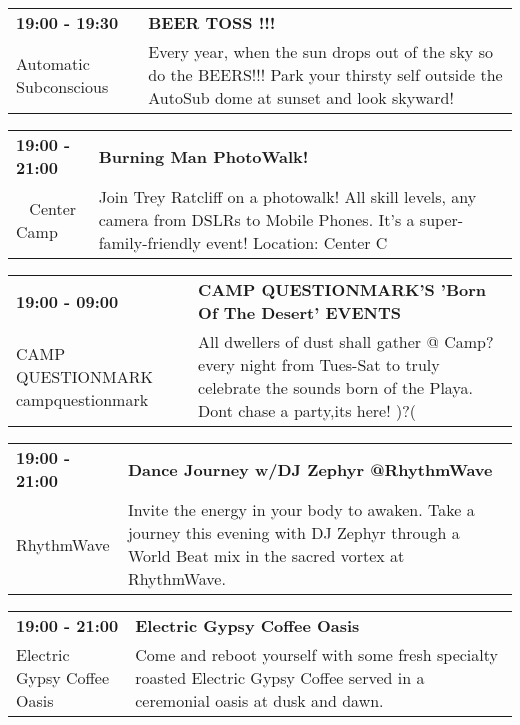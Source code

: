 \begin{tabular}{ p{1in} p{2.2in} }
    \textbf{19:00 - 19:30} & \textbf{BEER TOSS !!!} \\
    Automatic Subconscious \newline  & Every year, when the sun drops out of the sky so do the BEERS!!! Park your thirsty self outside the AutoSub dome at sunset and look skyward! \\
    \hline 
\end{tabular}
    
\begin{tabular}{ p{1in} p{2.2in} }
    \textbf{19:00 - 21:00} & \textbf{Burning Man PhotoWalk!} \\
    ~ \newline Center Camp & Join Trey Ratcliff on a photowalk! All skill levels, any camera from DSLRs to Mobile Phones.  It's a super-family-friendly event! Location: Center C \\
    \hline 
\end{tabular}
    
\begin{tabular}{ p{1in} p{2.2in} }
    \textbf{19:00 - 09:00} & \textbf{CAMP QUESTIONMARK'S 'Born Of The Desert' EVENTS  } \\
    CAMP QUESTIONMARK \newline campquestionmark & All dwellers of dust shall gather @ Camp? every night from Tues-Sat to truly celebrate the sounds born of the Playa. Dont chase a party,its here!
)?( \\
    \hline 
\end{tabular}
    
\begin{tabular}{ p{1in} p{2.2in} }
    \textbf{19:00 - 21:00} & \textbf{Dance Journey w/DJ Zephyr @RhythmWave} \\
    RhythmWave \newline  & Invite the energy in your body to awaken. Take a journey this evening with DJ Zephyr through a World Beat mix in the sacred vortex at RhythmWave. \\
    \hline 
\end{tabular}
    
\begin{tabular}{ p{1in} p{2.2in} }
    \textbf{19:00 - 21:00} & \textbf{Electric Gypsy Coffee Oasis} \\
    Electric Gypsy Coffee Oasis \newline  & Come and reboot yourself with some fresh specialty roasted Electric Gypsy Coffee served in a ceremonial oasis at dusk and dawn. \\
    \hline 
\end{tabular}
    
